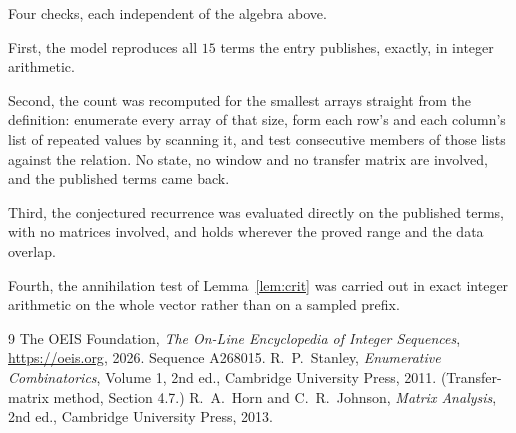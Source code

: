 \documentclass[11pt,a4paper]{article}
\theoremstyle{plain}
\theoremstyle{definition}
\begin{document}
Four checks, each independent of the algebra above.

First, the model reproduces all $15$ terms the entry publishes, exactly, in integer
arithmetic.

Second, the count was recomputed for the smallest arrays straight from the definition:
enumerate every array of that size, form each row's and each column's list of repeated values
by scanning it, and test consecutive members of those lists against the relation. No state, no
window and no transfer matrix are involved, and the published terms came back.

Third, the conjectured recurrence was evaluated directly on the published terms, with no
matrices involved, and holds wherever the proved range and the data overlap.

Fourth, the annihilation test of Lemma~\ref{lem:crit} was carried out in exact integer
arithmetic on the whole vector rather than on a sampled prefix.

\begin{thebibliography}{9}
 The OEIS Foundation, \emph{The On-Line Encyclopedia of Integer
Sequences}, \url{https://oeis.org}, 2026. Sequence A268015.
 R.~P.~Stanley, \emph{Enumerative Combinatorics}, Volume 1, 2nd ed.,
Cambridge University Press, 2011. (Transfer-matrix method, Section 4.7.)
 R.~A.~Horn and C.~R.~Johnson, \emph{Matrix Analysis}, 2nd ed., Cambridge
University Press, 2013.
\end{thebibliography}
\end{document}
